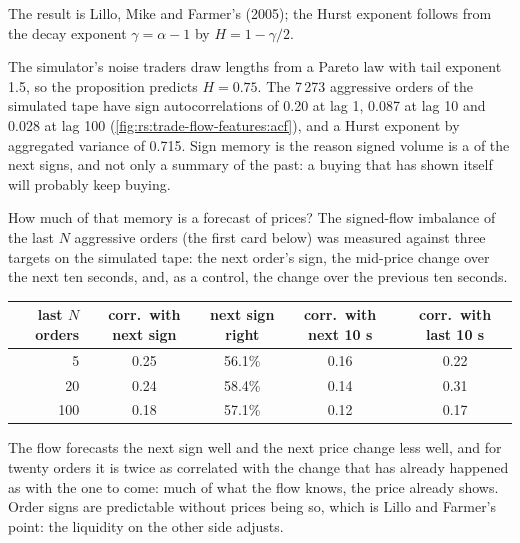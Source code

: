 \admitted
\noindent The result is Lillo, Mike and Farmer's (2005); the Hurst exponent follows from the decay exponent $\gamma = \alpha - 1$ by
$H = 1 - \gamma/2$.

The simulator's noise traders draw  lengths from a Pareto law with tail exponent 1.5, so the proposition predicts $H = 0.75$. The
7\,273 aggressive orders of the simulated tape have sign autocorrelations of 0.20 at lag 1, 0.087 at lag 10 and 0.028 at lag 100
(\cref{fig:rs:trade-flow-features:acf}), and a Hurst exponent by aggregated variance of 0.715. Sign memory is the reason signed volume is
a  of the next signs, and not only a summary of the past: a buying  that has shown itself will probably keep buying.

How much of that memory is a forecast of prices? The signed-flow imbalance of the last $N$ aggressive orders (the first card below) was
measured against three targets on the simulated tape: the next order's sign, the mid-price change over the next ten seconds, and, as a
control, the change over the previous ten seconds.

\begin{center}
\small
\begin{tabular}{@{}rcccc@{}}
\toprule
last $N$ orders & corr.\ with next sign & next sign right & corr.\ with next 10 s & corr.\ with last 10 s\\
\midrule
5 & 0.25 & 56.1\% & 0.16 & 0.22\\
20 & 0.24 & 58.4\% & 0.14 & 0.31\\
100 & 0.18 & 57.1\% & 0.12 & 0.17\\
\bottomrule
\end{tabular}
\end{center}

The flow forecasts the next sign well and the next price change less well, and for twenty orders it is twice as correlated with the
change that has already happened as with the one to come: much of what the flow knows, the price already shows. Order signs are
predictable without prices being so, which is Lillo and Farmer's point: the liquidity on the other side adjusts.

